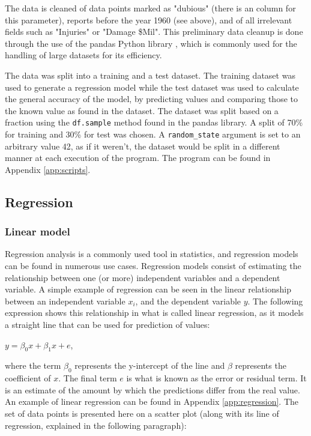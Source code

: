 \documentclass[11pt,letterpaper]{article}
\begin{document}
The data is cleaned of data points marked as "dubious" (there is an column for this parameter), reports before the year 1960 (see above), and of all irrelevant fields such as "Injuries" or "Damage \$Mil". This preliminary data cleanup is done through the use of the pandas Python library \cite{reback2020pandas}\cite{mckinney-proc-scipy-2010}, which is commonly used for the handling of large datasets for its efficiency.

The data was split into a training and a test dataset. The training dataset was used to generate a regression model while the test dataset was used to calculate the general accuracy of the model, by predicting values and comparing those to the known value as found in the dataset. The dataset was split based on a fraction using the \verb|df.sample| method found in the pandas library. A split of 70\% for training and 30\% for test was chosen. A \verb|random_state| argument is set to an arbitrary value 42, as if it weren't, the dataset would be split in a different manner at each execution of the program. The program can be found in Appendix \ref{app:scripts}.

\subsection{Regression}

\subsubsection{Linear model}

Regression analysis is a commonly used tool in statistics, and regression models can be found in numerous use cases. Regression models consist of estimating the relationship between one (or more) independent variables and a dependent variable. A simple example of regression can be seen in the linear relationship between an independent variable $x_{i}$, and the dependent variable $y$. The following expression shows this relationship in what is called linear regression, as it models a straight line that can be used for prediction of values:

$y =  \beta_0 x + \beta_1 x + e $,

where the term $\beta_0$ represents the y-intercept of the line and $\beta$ represents the coefficient of $x$. The final term $e$ is what is known as the error or residual term. It is an estimate of the amount by which the predictions differ from the real value. An example of linear regression can be found in Appendix \ref{app:regression}. The set of data points is presented here on a scatter plot (along with its line of regression, explained in the following paragraph):
\end{document}
